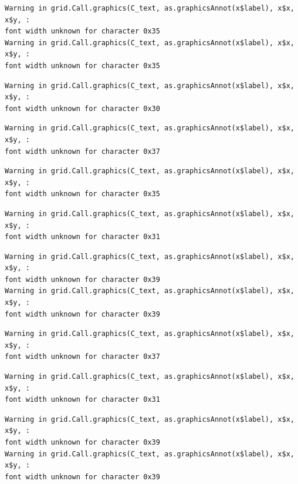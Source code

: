 \documentclass[
  letterpaper,
]{scrbook}
\begin{document}
\begin{verbatim}
Warning in grid.Call.graphics(C_text, as.graphicsAnnot(x$label), x$x, x$y, :
font width unknown for character 0x35
Warning in grid.Call.graphics(C_text, as.graphicsAnnot(x$label), x$x, x$y, :
font width unknown for character 0x35
\end{verbatim}

\begin{verbatim}
Warning in grid.Call.graphics(C_text, as.graphicsAnnot(x$label), x$x, x$y, :
font width unknown for character 0x30
\end{verbatim}

\begin{verbatim}
Warning in grid.Call.graphics(C_text, as.graphicsAnnot(x$label), x$x, x$y, :
font width unknown for character 0x37
\end{verbatim}

\begin{verbatim}
Warning in grid.Call.graphics(C_text, as.graphicsAnnot(x$label), x$x, x$y, :
font width unknown for character 0x35
\end{verbatim}

\begin{verbatim}
Warning in grid.Call.graphics(C_text, as.graphicsAnnot(x$label), x$x, x$y, :
font width unknown for character 0x31
\end{verbatim}

\begin{verbatim}
Warning in grid.Call.graphics(C_text, as.graphicsAnnot(x$label), x$x, x$y, :
font width unknown for character 0x39
Warning in grid.Call.graphics(C_text, as.graphicsAnnot(x$label), x$x, x$y, :
font width unknown for character 0x39
\end{verbatim}

\begin{verbatim}
Warning in grid.Call.graphics(C_text, as.graphicsAnnot(x$label), x$x, x$y, :
font width unknown for character 0x37
\end{verbatim}

\begin{verbatim}
Warning in grid.Call.graphics(C_text, as.graphicsAnnot(x$label), x$x, x$y, :
font width unknown for character 0x31
\end{verbatim}

\begin{verbatim}
Warning in grid.Call.graphics(C_text, as.graphicsAnnot(x$label), x$x, x$y, :
font width unknown for character 0x39
Warning in grid.Call.graphics(C_text, as.graphicsAnnot(x$label), x$x, x$y, :
font width unknown for character 0x39
\end{verbatim}
\end{document}
